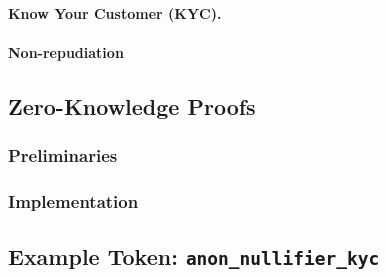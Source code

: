 
\paragraph{Know Your Customer (KYC).}


\paragraph{Non-repudiation}



\subsection{Zero-Knowledge Proofs}

\subsubsection{Preliminaries}

\subsubsection{Implementation}


\subsection{Example Token: \texttt{anon\_nullifier\_kyc}} %

